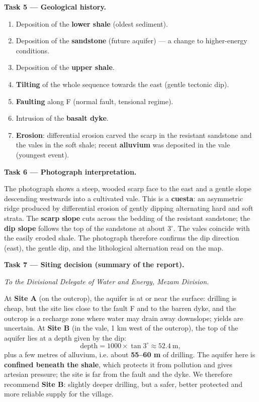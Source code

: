 \documentclass[11pt]{article}
\begin{document}
\textbf{Task 5 — Geological history.}\par
\begin{enumerate}
\item Deposition of the \textbf{lower shale} (oldest sediment).
\item Deposition of the \textbf{sandstone} (future aquifer) — a change to higher-energy conditions.
\item Deposition of the \textbf{upper shale}.
\item \textbf{Tilting} of the whole sequence towards the east (gentle tectonic dip).
\item \textbf{Faulting} along F (normal fault, tensional regime).
\item Intrusion of the \textbf{basalt dyke}.
\item \textbf{Erosion}: differential erosion carved the scarp in the resistant sandstone and the vales in the soft shale; recent \textbf{alluvium} was deposited in the vale (youngest event).
\end{enumerate}

\textbf{Task 6 — Photograph interpretation.}\par
The photograph shows a steep, wooded scarp face to the east and a gentle slope descending westwards into a cultivated vale. This is a \textbf{cuesta}: an asymmetric ridge produced by differential erosion of gently dipping alternating hard and soft strata. The \textbf{scarp slope} cuts across the bedding of the resistant sandstone; the \textbf{dip slope} follows the top of the sandstone at about 3$^{\circ}$. The vales coincide with the easily eroded shale. The photograph therefore confirms the dip direction (east), the gentle dip, and the lithological alternation read on the map.

\textbf{Task 7 — Siting decision (summary of the report).}\par
\emph{To the Divisional Delegate of Water and Energy, Mezam Division.}\par
At \textbf{Site A} (on the outcrop), the aquifer is at or near the surface: drilling is cheap, but the site lies close to the fault F and to the barren dyke, and the outcrop is a recharge zone where water may drain away downslope; yields are uncertain. At \textbf{Site B} (in the vale, 1 km west of the outcrop), the top of the aquifer lies at a depth given by the dip:
\[
\text{depth} = 1000 \times \tan 3^{\circ} \approx 52.4\ \mathrm{m},
\]
plus a few metres of alluvium, i.e. about \textbf{55--60 m} of drilling. The aquifer here is \textbf{confined beneath the shale}, which protects it from pollution and gives artesian pressure; the site is far from the fault and the dyke. We therefore recommend \textbf{Site B}: slightly deeper drilling, but a safer, better protected and more reliable supply for the village.
\end{document}
